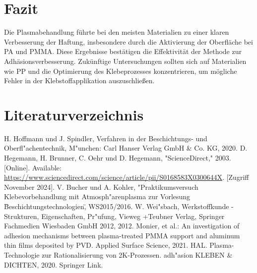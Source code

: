 \documentclass[a4paper,12pt]{article}
\begin{document}
\section{Fazit}
Die Plasmabehandlung führte bei den meisten Materialien zu einer klaren 
Verbesserung der Haftung, insbesondere durch die Aktivierung der Oberfläche 
bei PA und PMMA. Diese Ergebnisse bestätigen die Effektivität der Methode zur 
Adhäsionsverbesserung. Zukünftige Untersuchungen sollten sich auf 
Materialien wie PP und die Optimierung des Klebeprozesses konzentrieren, 
um mögliche Fehler in der Klebstoffapplikation auszuschließen.

\section{Literaturverzeichnis}
\begin{thebibliography}{99}
     H. Hoffmann und J. Spindler, Verfahren in der Beschichtungs- und Oberfl"achentechnik, M"unchen: Carl Hanser Verlag GmbH \& Co. KG, 2020.
     D. Hegemann, H. Brunner, C. Oehr und D. Hegemann, "ScienceDirect," 2003. [Online]. Available: \url{https://www.sciencedirect.com/science/article/pii/S0168583X0300644X}. [Zugriff November 2024].
     V. Bucher und A. Kohler, "Praktikumsversuch Klebevorbehandlung mit Atmosph"arenplasma zur Vorlesung \"Beschichtungstechnologien\", WS2015/2016.
     W. Wei"sbach, Werkstoffkunde - Strukturen, Eigenschaften, Pr"ufung, Vieweg +Teubner Verlag, Springer Fachmedien Wiesbaden GmbH 2012, 2012.
     Monier, et al.: An investigation of adhesion mechanisms between plasma-treated PMMA support and aluminum thin films deposited by PVD. Applied Surface Science, 2021. HAL.
     Plasma-Technologie zur Rationalisierung von 2K-Prozessen. adh"asion KLEBEN \& DICHTEN, 2020. Springer Link.
\end{thebibliography}
\end{document}
